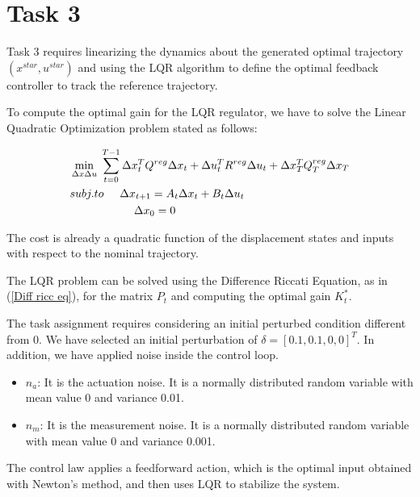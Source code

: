 \chapter*{Task 3}

Task 3 requires linearizing the dynamics about the generated optimal trajectory $(x^{star},u^{star})$ and using the LQR algorithm to define the optimal feedback controller to track the reference trajectory.

To compute the optimal gain for the LQR regulator, we have to solve the Linear Quadratic Optimization problem stated as follows:

\begin{equation} \label{LQR}
    \begin{aligned}
        &\min_{\Delta x \Delta u} \hspace{0.1cm} \sum_{t=0}^{T-1} \Delta x_t^TQ^{reg}\Delta x_t + \Delta u_t^TR^{reg}\Delta u_t + \Delta x_T ^TQ_T^{reg}\Delta x_T \\
        &subj. to \hspace{0.5cm} \Delta x_{t+1} = A_t \Delta x_t + B_t \Delta u_t\\
        & \hspace{2cm} \Delta x_0 = 0
    \end{aligned}
\end{equation}

The cost is already a quadratic function of the displacement states and inputs with respect to the nominal trajectory.

The LQR problem can be solved using the Difference Riccati Equation, as in (\ref{Diff ricc eq}), for the matrix $P_t$ and computing the optimal gain ${K}_t^*$. 

The task assignment requires considering an initial perturbed condition different from 0. We have selected an initial perturbation of $\delta = [0.1,0.1,0,0]^T$. In addition, we have applied noise inside the control loop.

\begin{itemize}
    \item $n_a$: It is the actuation noise. It is a normally distributed random variable with mean value 0 and variance 0.01.
    \item $n_m$: It is the measurement noise. It is a normally distributed random variable with mean value 0 and variance 0.001.
\end{itemize}

The control law applies a feedforward action, which is the optimal input obtained with Newton's method, and then uses LQR to stabilize the system.


